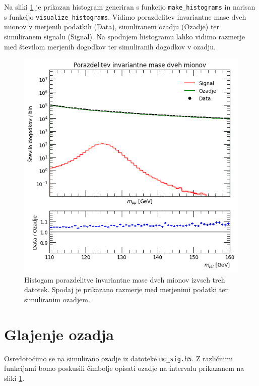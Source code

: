 \documentclass[slovene,11pt,a4paper]{article}
\begin{document}
Na sliki \ref{fig:my_hist} je prikazan histogram generiran s funkcijo \texttt{make\_histograms} in narisan s funkcijo \linebreak \texttt{visualize\_histograms}. Vidimo porazdelitev invariantne mase dveh mionov v merjenih podatkih (Data), simuliranem ozadju (Ozadje) ter simuliranem signalu (Signal). Na spodnjem histogramu lahko vidimo razmerje med številom merjenih dogodkov ter simuliranih dogodkov v ozadju.

\begin{figure}[h!]
    \centering
    \includegraphics[width=0.8\linewidth]{imgs/my_hist.png}
    \caption{Histogam porazdelitve invariantne mase dveh mionov izvseh treh datotek. Spodaj je prikazano razmerje med merjenimi podatki ter simuliranim ozadjem.}
    \label{fig:my_hist}
\end{figure}

\section{Glajenje ozadja}

Osredotočimo se na simulirano ozadje iz datoteke \texttt{mc\_sig.h5}. Z različnimi funkcijami bomo poskusili čimbolje opisati ozadje na intervalu prikazanem na sliki \ref{fig:my_hist}.
\end{document}
